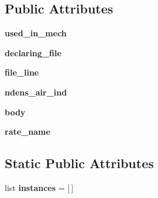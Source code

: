 \subsection*{Public Attributes}
\begin{DoxyCompactItemize}
\item 
{\bfseries used\+\_\+in\+\_\+mech}\hypertarget{classpecans_1_1mechgen_1_1RateExpression_ab04894c55dbe0031041e9ebe05dc8006}{}\label{classpecans_1_1mechgen_1_1RateExpression_ab04894c55dbe0031041e9ebe05dc8006}

\item 
{\bfseries declaring\+\_\+file}\hypertarget{classpecans_1_1mechgen_1_1RateExpression_a59cb46348e550bd9a06e059944c51c03}{}\label{classpecans_1_1mechgen_1_1RateExpression_a59cb46348e550bd9a06e059944c51c03}

\item 
{\bfseries file\+\_\+line}\hypertarget{classpecans_1_1mechgen_1_1RateExpression_a4bcc39375f52db34b759c1e88f6fb09e}{}\label{classpecans_1_1mechgen_1_1RateExpression_a4bcc39375f52db34b759c1e88f6fb09e}

\item 
{\bfseries ndens\+\_\+air\+\_\+ind}\hypertarget{classpecans_1_1mechgen_1_1RateExpression_a9713cbbd3d721163756021e5f5265ce3}{}\label{classpecans_1_1mechgen_1_1RateExpression_a9713cbbd3d721163756021e5f5265ce3}

\item 
{\bfseries body}\hypertarget{classpecans_1_1mechgen_1_1RateExpression_a76025977020514b92885973477e94fd2}{}\label{classpecans_1_1mechgen_1_1RateExpression_a76025977020514b92885973477e94fd2}

\item 
{\bfseries rate\+\_\+name}\hypertarget{classpecans_1_1mechgen_1_1RateExpression_a0c87729fceb6f1c26de999ff99c82544}{}\label{classpecans_1_1mechgen_1_1RateExpression_a0c87729fceb6f1c26de999ff99c82544}

\end{DoxyCompactItemize}
\subsection*{Static Public Attributes}
\begin{DoxyCompactItemize}
\item 
list {\bfseries instances} = \mbox{[}$\,$\mbox{]}\hypertarget{classpecans_1_1mechgen_1_1RateExpression_aab61de56261423df2138b7f354ce831a}{}\label{classpecans_1_1mechgen_1_1RateExpression_aab61de56261423df2138b7f354ce831a}

\end{DoxyCompactItemize}


